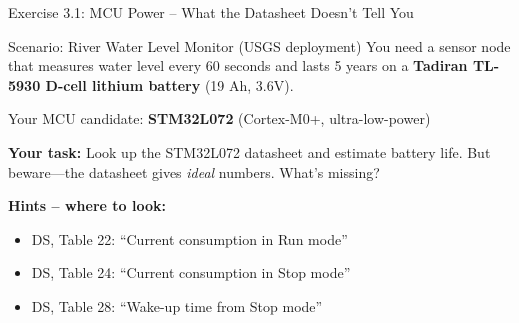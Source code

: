 \documentclass[aspectratio=169,11pt]{beamer}
\begin{document}
\begin{frame}{Exercise 3.1: MCU Power -- What the Datasheet Doesn't Tell You}
    \begin{block}{Scenario: River Water Level Monitor (USGS deployment)}
        You need a sensor node that measures water level every 60 seconds and lasts 5 years on a \textbf{Tadiran TL-5930 D-cell lithium battery} (19 Ah, 3.6V).
        
        \vspace{0.2cm}
        Your MCU candidate: \textbf{STM32L072} (Cortex-M0+, ultra-low-power)
        
        \vspace{0.2cm}
        \textbf{Your task:} Look up the STM32L072 datasheet and estimate battery life. But beware---the datasheet gives \textit{ideal} numbers. What's missing?
    \end{block}
    
    \vspace{0.2cm}
    \textbf{Hints -- where to look:}
    \begin{itemize}
        \item DS, Table 22: ``Current consumption in Run mode''
        \item DS, Table 24: ``Current consumption in Stop mode''
        \item DS, Table 28: ``Wake-up time from Stop mode''
    \end{itemize}
\end{frame}
\end{document}
